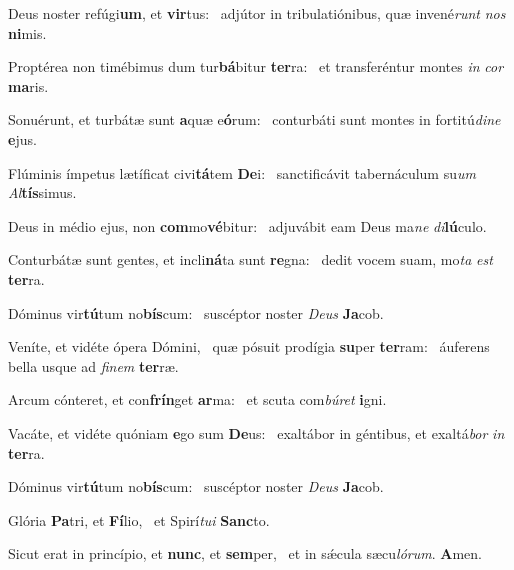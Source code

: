 \item Deus noster refúgi\textbf{um}, et \textbf{vir}tus:~\psstar{} adjútor in tribulatiónibus, quæ invené\textit{runt} \textit{nos} \textbf{ni}mis.
\item Proptérea non timébimus dum tur\textbf{bá}bitur \textbf{ter}ra:~\psstar{} et transferéntur montes \textit{in} \textit{cor} \textbf{ma}ris.
\item Sonuérunt, et turbátæ sunt \textbf{a}quæ e\textbf{ó}rum:~\psstar{} conturbáti sunt montes in fortitú\textit{dine} \textbf{e}jus.
\item Flúminis ímpetus lætíficat civi\textbf{tá}tem \textbf{De}i:~\psstar{} sanctificávit tabernáculum su\textit{um} \textit{Al}\textbf{tís}simus.
\item Deus in médio ejus, non \textbf{com}mo\textbf{vé}bitur:~\psstar{} adjuvábit eam Deus ma\textit{ne} \textit{di}\textbf{lú}culo.
\item Conturbátæ sunt gentes, et incli\textbf{ná}ta sunt \textbf{re}gna:~\psstar{} dedit vocem suam, mo\textit{ta} \textit{est} \textbf{ter}ra.
\item Dóminus vir\textbf{tú}tum no\textbf{bís}\-cum:~\psstar{} suscéptor noster \textit{Deus} \textbf{Ja}cob.
\item Veníte, et vidéte ópera Dómini,~\pscross{} quæ pósuit prodígia \textbf{su}per \textbf{ter}ram:~\psstar{} áuferens bella usque ad \textit{finem} \textbf{ter}ræ.
\item Arcum cónteret, et con\textbf{frín}get \textbf{ar}ma:~\psstar{} et scuta com\textit{búret} \textbf{i}gni.
\item Vacáte, et vidéte quóniam \textbf{e}go sum \textbf{De}us:~\psstar{} exaltábor in géntibus, et exaltá\textit{bor} \textit{in} \textbf{ter}ra.
\item Dóminus vir\textbf{tú}tum no\textbf{bís}\-cum:~\psstar{} suscéptor noster \textit{Deus} \textbf{Ja}cob.
\item Glória \textbf{Pa}tri, et \textbf{Fí}lio,~\psstar{} et Spirí\textit{tui} \textbf{Sanc}to.
\item Sicut erat in princípio, et \textbf{nunc}, et \textbf{sem}per,~\psstar{} et in sǽcula sæcu\textit{lórum}. \textbf{A}men.